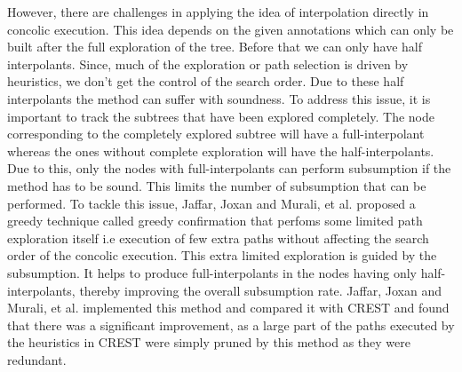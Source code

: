 \documentclass[	runningheads,
				a4paper]{llncs}
\begin{document}
However, there are challenges \cite{jaffar2013boosting} in applying the idea of interpolation directly in concolic execution. This idea depends on the given annotations which can only be built after the full exploration of the tree. Before that we can only have half interpolants. Since, much of the exploration or path selection is driven by heuristics, we don't get the control of the search order. Due to these half interpolants the method can suffer with soundness. To address this issue, it is important to track the subtrees that have been explored completely. The node corresponding to the completely explored subtree will have a full-interpolant whereas the ones without complete exploration will have the half-interpolants. Due to this, only the nodes with full-interpolants can perform subsumption if the method has to be sound. This limits the number of subsumption that can be performed. To tackle this issue, Jaffar, Joxan and Murali, et al. \cite{jaffar2013boosting} proposed a greedy technique called greedy confirmation that perfoms some limited path exploration itself i.e execution of few extra paths without affecting the search order of the concolic execution. This extra limited exploration is guided by the subsumption. It helps to produce full-interpolants in the nodes having only half-interpolants, thereby improving the overall subsumption rate. Jaffar, Joxan and Murali, et al. \cite{jaffar2013boosting} implemented this method and compared it with CREST
\cite{kousik2008heuristic} and found that there was a significant improvement, as a large part of the paths executed by the heuristics in CREST were simply pruned by this method as they were redundant.

\end{document}
